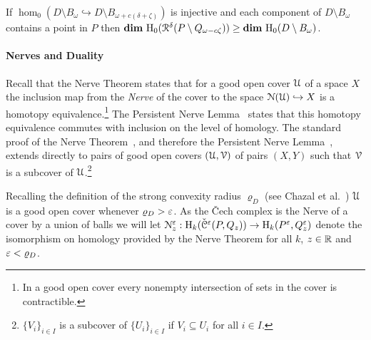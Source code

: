\begin{lemma}\label{lem:assumption2}
  If $\hom_0(D\setminus B_\omega\hookrightarrow D\setminus B_{\omega+c(\delta+\zeta)})$ is injective and each component of $D\setminus B_\omega$ contains a point in $P$ then $\mathbf{dim}~\mathrm{H}_0(\mathcal{R}^\delta(P\setminus Q_{\omega-c\zeta})) \geq \mathbf{dim}~\mathrm{H}_0(D\setminus B_\omega)$.
\end{lemma}

\paragraph*{Nerves and Duality}

Recall that the Nerve Theorem states that for a good open cover $\mathcal{U}$ of a space $X$ the inclusion map from the \emph{Nerve} of the cover to the space $\mathcal{N}(\mathcal{U})\hookrightarrow X$ is a homotopy equivalence.\footnote{In a good open cover every nonempty intersection of sets in the cover is contractible.}
The Persistent Nerve Lemma~\cite{chazal08towards} states that this homotopy equivalence commutes with inclusion on the level of homology.
The standard proof of the Nerve Theorem~\cite{kozlov07combinatorial}, and therefore the Persistent Nerve Lemma~\cite{chazal08towards}, extends directly to pairs of good open covers $(\mathcal{U}, \mathcal{V})$ of pairs $(X, Y)$ such that $\mathcal{V}$ is a subcover of $\mathcal{U}$.\footnote{$\{V_i\}_{i\in I}$ is a subcover of $\{U_i\}_{i\in I}$ if $V_i\subseteq U_i$ for all $i\in I$.}

Recalling the definition of the strong convexity radius $\varrho_D$ (see Chazal et al.~\cite{chazal09analysis}) $\mathcal{U}$ is a good open cover whenever $\varrho_D > \varepsilon$.
As the \v Cech complex is the Nerve of a cover by a union of balls we will let $\mathcal{N}_z^\varepsilon : \mathrm{H}_k(\check{\mathcal{C}}^\varepsilon(P,Q_z))\to \mathrm{H}_k(P^\varepsilon, Q_z^\varepsilon)$ denote the isomorphism on homology provided by the Nerve Theorem for all $k$, $z\in\mathbb{R}$ and $\varepsilon < \varrho_D$.

